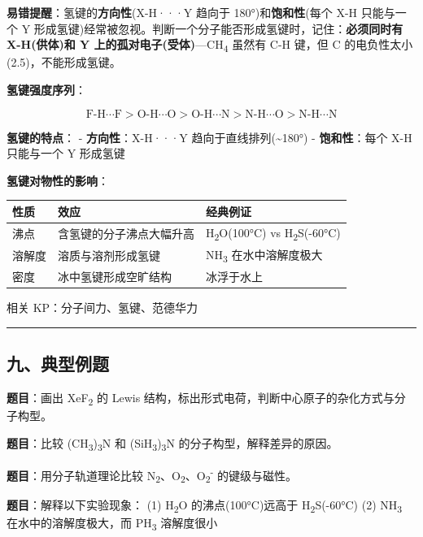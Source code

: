 \textbf{易错提醒}：氢键的\textbf{方向性}(X-H···Y 趋向于 180°)和\textbf{饱和性}(每个 X-H 只能与一个 Y 形成氢键)经常被忽视。判断一个分子能否形成氢键时，记住：\textbf{必须同时有 X-H(供体)和 Y 上的孤对电子(受体)}---CH\textsubscript{4} 虽然有 C-H 键，但 C 的电负性太小(2.5)，不能形成氢键。

\textbf{氢键强度序列}：

\[
\text{F-H} \cdots \text{F} > \text{O-H} \cdots \text{O} > \text{O-H} \cdots \text{N} > \text{N-H} \cdots \text{O} > \text{N-H} \cdots \text{N}
\]

\textbf{氢键的特点}：
- \textbf{方向性}：X-H···Y 趋向于直线排列(\textasciitilde180°)
- \textbf{饱和性}：每个 X-H 只能与一个 Y 形成氢键

\textbf{氢键对物性的影响}：

{\def\LTcaptype{none} %
\begin{longtable}[]{@{}lll@{}}
\toprule\noalign{}
性质 & 效应 & 经典例证 \\
\midrule\noalign{}
\endhead
\bottomrule\noalign{}
\endlastfoot
沸点 & 含氢键的分子沸点大幅升高 & H\textsubscript{2}O(100°C) vs H\textsubscript{2}S(-60°C) \\
溶解度 & 溶质与溶剂形成氢键 & NH\textsubscript{3} 在水中溶解度极大 \\
密度 & 冰中氢键形成空旷结构 & 冰浮于水上 \\
\end{longtable}
}

相关 KP：分子间力、氢键、范德华力

\begin{center}\rule{0.5\linewidth}{0.5pt}\end{center}

\subsection{九、典型例题}\label{ux4e5dux5178ux578bux4f8bux9898}

\textbf{题目}：画出 XeF\textsubscript{2} 的 Lewis 结构，标出形式电荷，判断中心原子的杂化方式与分子构型。

\textbf{题目}：比较 (CH\textsubscript{3})\textsubscript{3}N 和 (SiH\textsubscript{3})\textsubscript{3}N 的分子构型，解释差异的原因。

\textbf{题目}：用分子轨道理论比较 N\textsubscript{2}、O\textsubscript{2}、O\textsubscript{2}\textsuperscript{-} 的键级与磁性。

\textbf{题目}：解释以下实验现象：
(1) H\textsubscript{2}O 的沸点(100°C)远高于 H\textsubscript{2}S(-60°C)
(2) NH\textsubscript{3} 在水中的溶解度极大，而 PH\textsubscript{3} 溶解度很小

